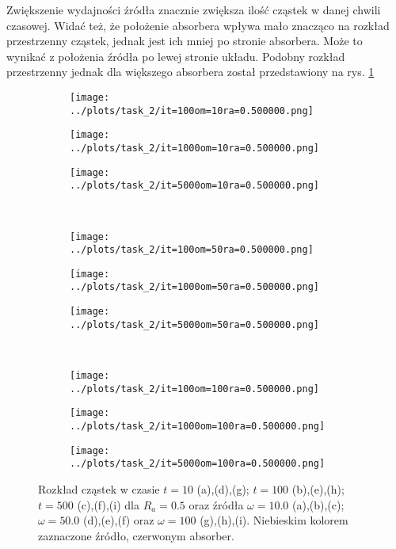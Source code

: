 \documentclass[a4paper, 12pt]{article}
\begin{document}
\noaka Zwiększenie wydajności źródła znacznie zwiększa ilość cząstek w danej chwili czasowej. Widać też, że położenie absorbera wpływa mało znacząco na rozkład przestrzenny cząstek, jednak jest ich mniej po stronie absorbera. Może to wynikać z położenia źródła po lewej stronie układu. Podobny rozkład przestrzenny jednak dla większego absorbera został przedstawiony na rys. \ref{rozklad_ra2}

\begin{figure}[H]
	\centering
	\begin{subfigure}{0.30\textwidth}
		\centering
		\texttt{[image: ../plots/task\_2/it=100om=10ra=0.500000.png]}
		\caption{}
	\end{subfigure}
	\begin{subfigure}{0.30\textwidth}
		\centering
		\texttt{[image: ../plots/task\_2/it=1000om=10ra=0.500000.png]}
		\caption{}
	\end{subfigure}
	\begin{subfigure}{0.30\textwidth}
		\centering
		\texttt{[image: ../plots/task\_2/it=5000om=10ra=0.500000.png]}
		\caption{}
	\end{subfigure}
	\\
	\begin{subfigure}{0.30\textwidth}
		\centering
		\texttt{[image: ../plots/task\_2/it=100om=50ra=0.500000.png]}
		\caption{}
	\end{subfigure}
	\begin{subfigure}{0.30\textwidth}
		\centering
		\texttt{[image: ../plots/task\_2/it=1000om=50ra=0.500000.png]}
		\caption{}
	\end{subfigure}
	\begin{subfigure}{0.30\textwidth}
		\centering
		\texttt{[image: ../plots/task\_2/it=5000om=50ra=0.500000.png]}
		\caption{}
	\end{subfigure}
	\\
	\begin{subfigure}{0.30\textwidth}
		\centering
		\texttt{[image: ../plots/task\_2/it=100om=100ra=0.500000.png]}
		\caption{}
	\end{subfigure}
	\begin{subfigure}{0.30\textwidth}
		\centering
		\texttt{[image: ../plots/task\_2/it=1000om=100ra=0.500000.png]}
		\caption{}
	\end{subfigure}
	\begin{subfigure}{0.30\textwidth}
		\centering
		\texttt{[image: ../plots/task\_2/it=5000om=100ra=0.500000.png]}
		\caption{}
	\end{subfigure}
	
	\caption{Rozkład cząstek w czasie $t=10$ (a),(d),(g); $t=100$ (b),(e),(h); $t=500$ (c),(f),(i) dla $R_a = 0.5$ oraz źródła $\omega = 10.0$ (a),(b),(c); $\omega = 50.0$ (d),(e),(f) oraz $\omega = 100$ (g),(h),(i). Niebieskim kolorem zaznaczone źródło, czerwonym absorber.}
	\label{rozklad_ra2}
\end{figure}
 
\end{document}
